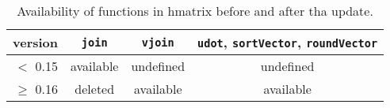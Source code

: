 \begin{table*}[tbp]
  \centering
  \begin{tabular}{r|ccc}
    version & \texttt{join} & \texttt{vjoin} & \texttt{udot}, \texttt{sortVector}, \texttt{roundVector}\\ \hline
    $<$ 0.15     & available  & undefined & undefined\\
    $\geq$ 0.16  & deleted & available & available\\
  \end{tabular}
  \caption{Availability of functions in hmatrix before and after tha update.}
  \label{table:join}
\end{table*}